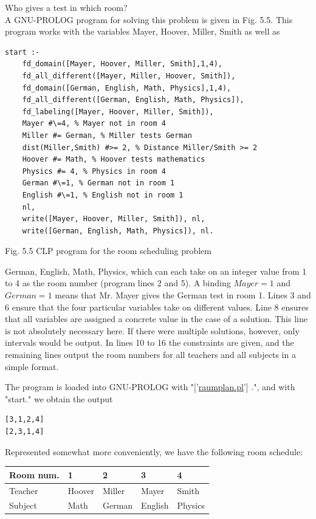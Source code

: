 \documentclass[10pt]{book}
\begin{document}
Who gives a test in which room?\\
A GNU-PROLOG program for solving this problem is given in Fig. 5.5. This program works with the variables Mayer, Hoover, Miller, Smith as well as
\begin{verbatim}
start :-
    fd_domain([Mayer, Hoover, Miller, Smith],1,4),
    fd_all_different([Mayer, Miller, Hoover, Smith]),
    fd_domain([German, English, Math, Physics],1,4),
    fd_all_different([German, English, Math, Physics]),
    fd_labeling([Mayer, Hoover, Miller, Smith]),
    Mayer #\=4, % Mayer not in room 4
    Miller #= German, % Miller tests German
    dist(Miller,Smith) #>= 2, % Distance Miller/Smith >= 2
    Hoover #= Math, % Hoover tests mathematics
    Physics #= 4, % Physics in room 4
    German #\=1, % German not in room 1
    English #\=1, % English not in room 1
    nl,
    write([Mayer, Hoover, Miller, Smith]), nl,
    write([German, English, Math, Physics]), nl.
\end{verbatim}

Fig. 5.5 CLP program for the room scheduling problem

German, English, Math, Physics, which can each take on an integer value from 1 to 4 as the room number (program lines 2 and 5). A binding $Mayer = 1$ and $German = 1$ means that Mr. Mayer gives the German test in room 1. Lines 3 and 6 ensure that the four particular variables take on different values. Line 8 ensures that all variables are assigned a concrete value in the case of a solution. This line is not absolutely necessary here. If there were multiple solutions, however, only intervals would be output. In lines 10 to 16 the constraints are given, and the remaining lines output the room numbers for all teachers and all subjects in a simple format.

The program is loaded into GNU-PROLOG with "['\href{http://raumplan.pl}{raumplan.pl}'] .", and with "start." we obtain the output

\begin{verbatim}
[3,1,2,4]
[2,3,1,4]
\end{verbatim}

Represented somewhat more conveniently, we have the following room schedule:

\begin{center}
\begin{tabular}{lllll}
\hline
Room num. & 1 & 2 & 3 & 4 \\
\hline
Teacher & Hoover & Miller & Mayer & Smith \\
\hline
Subject & Math & German & English & Physics \\
\hline
\end{tabular}
\end{center}
\end{document}
